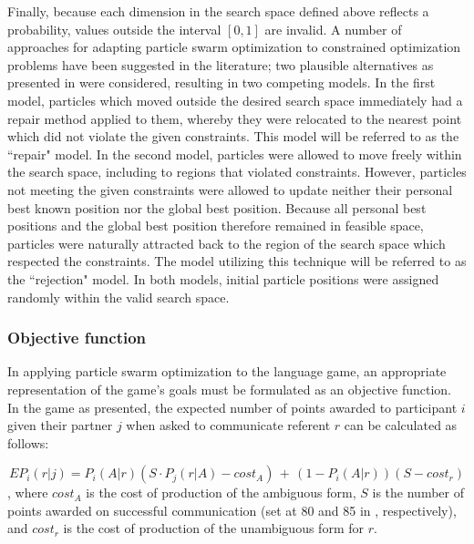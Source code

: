 \documentclass[12pt,a4paper]{article}
\begin{document}
Finally, because each dimension in the search space defined above reflects a probability, values outside the interval $[0, 1]$ are invalid. A number of approaches for adapting particle swarm optimization to constrained optimization problems have been suggested in the literature; two plausible alternatives as presented in \cite{engelbrecht2005} were considered, resulting in two competing models. 
In the first model, particles which moved outside the desired search space immediately had a repair method applied to them, whereby they were relocated to the nearest point which did not violate the given constraints. This model will be referred to as the ``repair" model. In the second model, particles were allowed to move freely within the search space, including to regions that violated constraints. However, particles not meeting the given constraints were allowed to update neither their personal best known position nor the global best position. Because all personal best positions and the global best position therefore remained in feasible space, particles were naturally attracted back to the region of the search space which respected the constraints. The model utilizing this technique will be referred to as the ``rejection" model. In both models, initial particle positions were assigned randomly within the valid search space.


 
\subsubsection{Objective function}
In applying particle swarm optimization to the \citeauthor{rohde2012} language game, an appropriate representation of the game's goals must be formulated as an objective function. In the game as presented, the expected number of points awarded to participant $i$ given their partner $j$ when asked to communicate referent $r$ can be calculated as follows:

\begin{equation}
EP_{i}(r|j) = P_i(A|r)(S \cdot P_j(r|A) - cost_A) \,+\, (1 - P_i(A|r))(S - cost_r) 
\end{equation},
where $cost_A$ is the cost of production of the ambiguous form, $S$ is the number of points awarded on successful communication (set at 80 and 85 in \citeauthor{rohde2012}, respectively), and $cost_r$ is the cost of production of the unambiguous form for $r$.
\end{document}
